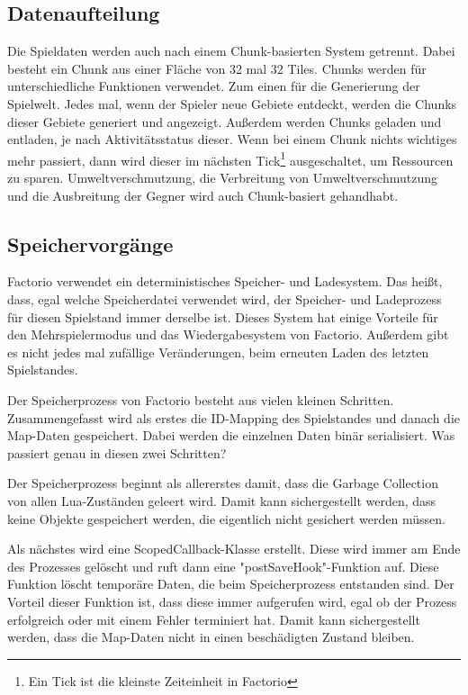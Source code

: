 \subsection{Datenaufteilung} \label{ssec:factorioDatenaufteilung}
Die Spieldaten werden auch nach einem Chunk-basierten System getrennt. Dabei besteht ein Chunk aus einer Fläche von 32 mal 32 Tiles. Chunks werden für unterschiedliche Funktionen verwendet. Zum einen für die Generierung der Spielwelt. Jedes mal, wenn der Spieler neue Gebiete entdeckt, werden die Chunks dieser Gebiete generiert und angezeigt. Außerdem werden Chunks geladen und entladen, je nach Aktivitätsstatus dieser. Wenn bei einem Chunk nichts wichtiges mehr passiert, dann wird dieser im nächsten Tick\footnote{Ein Tick ist die kleinste Zeiteinheit in Factorio\cite{factorioTime}} ausgeschaltet, um Ressourcen zu sparen. Umweltverschmutzung, die Verbreitung von Umweltverschmutzung und die Ausbreitung der Gegner wird auch Chunk-basiert gehandhabt. 
\cite{factorioMapStructure}



\subsection{Speichervorgänge}
Factorio verwendet ein deterministisches Speicher- und Ladesystem. Das heißt, dass, egal welche Speicherdatei verwendet wird, der Speicher- und Ladeprozess für diesen Spielstand immer derselbe ist. Dieses System hat einige Vorteile für den Mehrspielermodus und das Wiedergabesystem von Factorio. Außerdem gibt es nicht jedes mal zufällige Veränderungen, beim erneuten Laden des letzten Spielstandes.\cite{factorioGithubSaveLoad}

Der Speicherprozess von Factorio besteht aus vielen kleinen Schritten. Zusammengefasst wird als erstes die ID-Mapping des Spielstandes und danach die Map-Daten gespeichert.
\cite{factorioFridayFacts270} Dabei werden die einzelnen Daten binär serialisiert.\cite{factorioGithubSaveLoad} Was passiert genau in diesen zwei Schritten? 

Der Speicherprozess beginnt als allererstes damit, dass die Garbage Collection von allen Lua-Zuständen geleert wird. Damit kann sichergestellt werden, dass keine Objekte gespeichert werden, die eigentlich nicht gesichert werden müssen.\cite{factorioGithubSaveLoad}

Als nächstes wird eine ScopedCallback-Klasse erstellt. Diese wird immer am Ende des Prozesses gelöscht und ruft dann eine "postSaveHook"-Funktion auf. Diese Funktion löscht temporäre Daten, die beim Speicherprozess entstanden sind. Der Vorteil dieser Funktion ist, dass diese immer aufgerufen wird, egal ob der Prozess erfolgreich oder mit einem Fehler terminiert hat. Damit kann sichergestellt werden, dass die Map-Daten nicht in einen beschädigten Zustand bleiben.\cite{factorioGithubSaveLoad}

